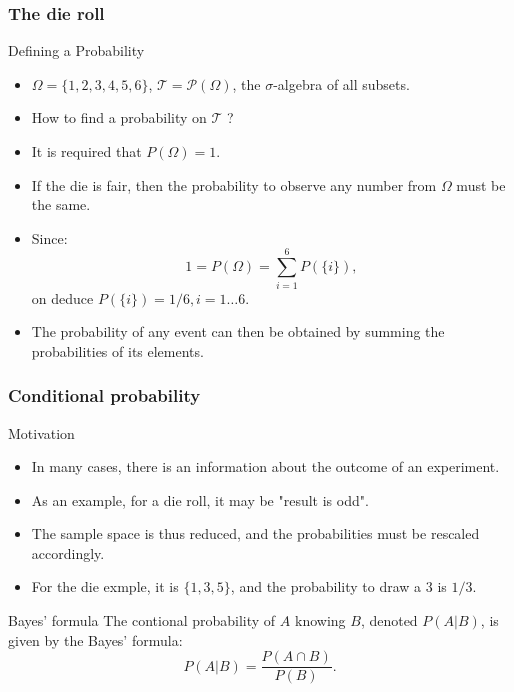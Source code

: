 \begin{frame}
    \frametitle{The die roll}
\begin{block}{Defining a Probability}
    \begin{itemize}
        \item<+-> $\Omega = \{1,2,3,4,5,6\}$, $\mathcal{T} = \mathcal{P}\left( \Omega \right)$, 
        the $\sigma$-algebra of all subsets. 
        \item<+-> How to find a probability on $\mathcal{T}$ ?
        \item<+-> It is required that $P\left( \Omega \right) = 1.$
        \item<+-> If the die is fair, then the probability to observe any number
        from $\Omega$ must be the same.
        \item<+-> Since:
        \begin{equation}
            1 = P\left( \Omega \right) = \sum_{i=1}^6 P\left( \{i\} \right),
        \end{equation}
        on deduce $P\left( \{i\} \right) = 1/6, i=1 \dots 6.$
        \item<+-> The probability of any event can then be obtained by summing the probabilities
        of its elements. 
    \end{itemize}
\end{block}
\end{frame}
\begin{frame}
    \frametitle{Conditional probability}
    \begin{block}{Motivation}
    \begin{itemize}
        \item<+-> In many cases, there is an information about the outcome of
        an experiment.
        \item<+-> As an example, for a die roll, it may be "result is odd".
        \item<+-> The sample space is thus reduced, and the probabilities must 
        be rescaled accordingly.
        \item<+-> For the die exmple, it is $\{1,3,5\}$, and the probability 
        to draw a $3$ is $1/3.$
    \end{itemize}
    \end{block}
    \begin{block}{Bayes' formula}
        The contional probability of $A$ knowing $B$, denoted $P\left( A \vert B \right)$, is given by the Bayes' formula:
        \begin{equation}
            P\left( A \vert B  \right) = \frac{P\left( A \cap B \right)}{P(B)}.
        \end{equation}
    \end{block}
\end{frame}

